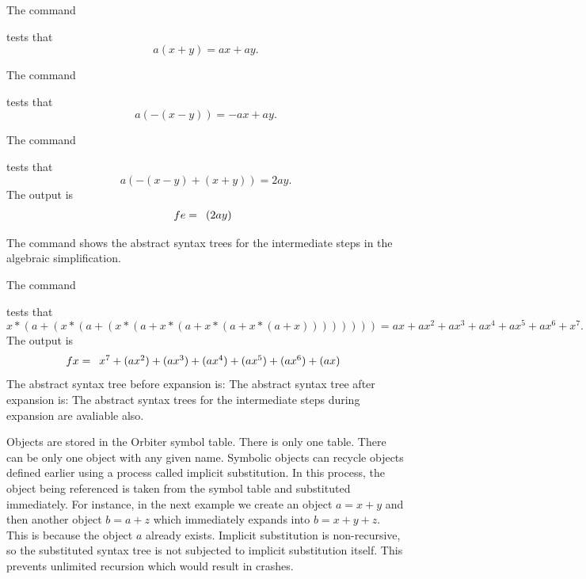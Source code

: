 
\bigskip


The command 


tests that 
$$
a(x+y) = ax + ay.
$$

\bigskip


The command 


tests that 
$$
a(-(x-y)) = -ax + ay.
$$

\bigskip



The command 


tests that 
$$
a(-(x-y)+(x+y)) = 2ay.
$$
The output is 
$$
fe = 
\begin{array}{*{1}c}
(2 a y)\\
\end{array}
$$


The command shows the abstract syntax trees 
for the intermediate steps in the algebraic simplification.

\bigskip




The command 


tests that 
$$
x*(a+(x*(a+(x*(a+x*(a+x*(a+x*(a+x)))))))) = ax + ax^2+ax^3+ax^4+ax^5+ax^6+x^7.
$$
The output is 
$$
fx = 
\begin{array}{*{1}c}
x^{7} + (a x^{2}) + (a x^{3}) + (a x^{4}) + (a x^{5}) + (a x^{6}) + (a x)\\
\end{array}
$$
The abstract syntax tree before expansion is:
The abstract syntax tree after expansion is:
The abstract syntax trees for the intermediate steps 
during expansion are avaliable also. 

\bigskip



Objects are stored in the Orbiter symbol table. There is only one table. 
There can be only one object with any given name.
Symbolic objects can recycle objects 
defined earlier using a process called implicit substitution.
In this process, the object being referenced 
is taken from the symbol table and substituted immediately.
For instance, in the next example we create an 
object $a = x + y$ and then another object $b = a+z$ 
which immediately expands into $b = x + y + z.$
This is because the object $a$ already exists. 
Implicit substitution is non-recursive, 
so the substituted syntax tree is not subjected to implicit substitution itself. 
This prevents unlimited recursion which would result in crashes. 


